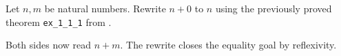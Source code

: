 Let $n,m$ be natural numbers. Rewrite $n+0$ to $n$ using the previously proved theorem \texttt{ex_1_1_1} from .

Both sides now read $n+m$. The rewrite closes the equality goal by reflexivity.
